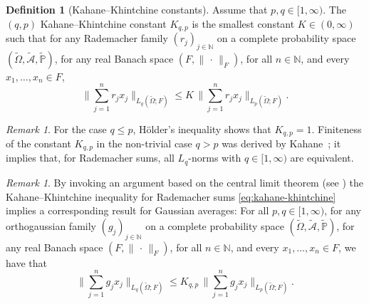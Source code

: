 \documentclass[reqno]{amsart}
\numberwithin{equation}{section}
\newcommand{\bbN}{\mathbb{N}}
\newcommand{\bbP}{\mathbb{P}}
\newcommand{\cA}{\mathcal{A}}
\newcommand{\Omegat}{\widetilde{\Omega}}
\newcommand{\cAt}{\widetilde{\cA}}
\newcommand{\bbPt}{\widetilde{\bbP}}
\newcommand{\norm}[2]{     \| #1       \|_{ #2 }}
\theoremstyle{remark}
\newtheorem{remark}[lemma]{Remark}
\theoremstyle{definition}
\newtheorem{definition}[lemma]{Definition}
\begin{document}
\begin{definition}[Kahane--Khintchine constants]
	\label{def:Kqp-constant}
	Assume that $p,q\in[1,\infty)$. 
	The  $(q,p)$ Kahane--Khintchine constant $K_{q,p}$ 
	is the smallest constant $K\in(0,\infty)$ 
	such that 
	for any Rademacher family $(r_j)_{j\in\bbN}$ 
	on a complete probability space 
	$(\Omegat,\cAt,\bbPt)$, 
	for any real Banach space $(F,\norm{\,\cdot\,}{F})$,  
	for all $n\in\bbN$, 
	and every $x_1,\ldots,x_n\in F$, 
	\begin{equation}\label{eq:kahane-khintchine} 
	\biggl\| 
	\sum_{j=1}^n r_j x_j
	\biggr\|_{L_q(\Omegat;F)} 
	\leq K \,
	\biggl\| 
	\sum_{j=1}^n r_j x_j
	\biggr\|_{L_p(\Omegat;F)}. 
	\end{equation} 
\end{definition} 

\begin{remark} 
	For the case $q\leq p$, 
	H\"older's inequality 
	shows 
	that ${K_{q,p}=1}$. 
	Finiteness of the constant 
	$K_{q,p}$ in the non-trivial case $q>p$ 
	was derived by Kahane~\cite{Kahane1985}; 
	it implies that, for Rademacher sums,  
	all $L_q$-norms 
	with $q\in[1,\infty)$     
	are equivalent. 
\end{remark} 

\begin{remark}\label{rem:kahane-khintchine-gaussian} 
	By invoking an argument 
	based on the central limit theorem 
	(see \cite[p.~103]{LedouxTalagrand2011}) 
	the Kahane--Khintchine inequality 
	for Rademacher sums \eqref{eq:kahane-khintchine} implies 
	a corresponding result for Gaussian averages: 
	For all $p,q\in[1,\infty)$, 
	for any orthogaussian family $(g_j)_{j\in\bbN}$ 
	on a complete probability space 
	$(\Omegat,\cAt,\bbPt)$, 
	for any real Banach space $(F,\norm{\,\cdot\,}{F})$,  
	for all $n\in\bbN$, 
	and every $x_1,\ldots,x_n\in F$, we have that 
	\begin{equation}\label{eq:kahane-khintchine-gaussian} 
	\biggl\| 
	\sum_{j=1}^n g_j x_j
	\biggr\|_{L_q(\Omegat;F)} 
	\leq K_{q,p} \,
	\biggl\| 
	\sum_{j=1}^n g_j x_j
	\biggr\|_{L_p(\Omegat;F)}. 
	\end{equation} 
\end{remark} 
\end{document}
